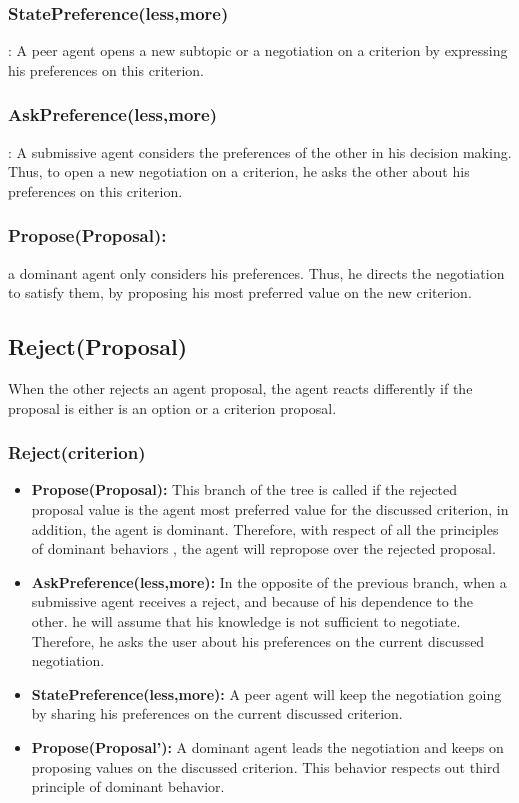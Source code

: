 \documentclass{llncs}
\begin{document}
 \subsubsection{StatePreference(less,more)}:  A peer agent opens a new subtopic or a negotiation on a criterion by expressing his preferences on this criterion.
 \subsubsection{AskPreference(less,more)}:  A submissive agent considers the preferences of the other in his decision making. Thus, to open a new negotiation on a criterion, he asks the other about his preferences on this criterion.
 \subsubsection {Propose(Proposal):} a dominant agent only considers his preferences. Thus, he directs the negotiation to satisfy them, by proposing his most preferred value on the new criterion. 
 
 \subsection{Reject(Proposal)}
 	When the other rejects an agent proposal, the agent reacts differently if the proposal is either is an option or a criterion proposal.
 		\subsubsection{Reject(criterion)}
 		\begin{itemize}
 			\item \textbf{Propose(Proposal):} This branch of the tree is called if the rejected proposal value is the agent most preferred value for the discussed criterion, in addition, the agent is dominant. Therefore, with respect of all the principles of dominant behaviors , the agent will repropose over the rejected proposal.
 			\item \textbf{AskPreference(less,more):} In the opposite of the previous branch, when a submissive agent receives a reject, and because of his dependence to the other. he will assume that his knowledge is not sufficient to negotiate. Therefore, he asks the user about his preferences on the current discussed negotiation. 
 			\item \textbf{StatePreference(less,more):} A peer agent will keep the negotiation going by sharing his preferences on the current discussed criterion.
 			\item\textbf{Propose(Proposal'):} A dominant agent leads the negotiation and keeps on proposing values on the discussed criterion. This behavior respects out third principle of dominant behavior.
 			
 		\end{itemize}
\end{document}
